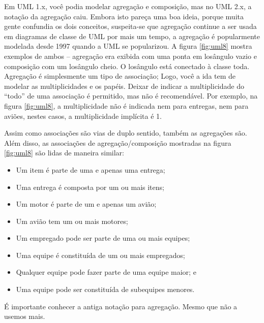 Em UML 1.x, você podia modelar agregação e composição, mas no UML 2.x, a notação da agregação caiu. Embora isto pareça uma boa ideia, porque muita gente confundia os dois conceitos, suspeita-se que agregação continue a ser usada em diagramas de classe de UML por mais um tempo, a agregação é popularmente modelada desde 1997 quando a UML se popularizou. A figura \ref{fig:uml8} mostra exemplos de ambos -- agregação era exibida com uma ponta em losângulo vazio e composição com um losângulo cheio. O losângulo está conectado à classe toda. Agregação é simplesmente um tipo de associação; Logo, você a ida tem de modelar as multiplicidades e os papéis. Deixar de indicar a multiplicidade do ``todo'' de uma associação é permitido, mas não é recomendável. Por exemplo, na figura \ref{fig:uml8}, a multiplicidade não é indicada nem para entregas, nem para aviões, nestes casos, a multiplicidade implícita é 1.

Assim como associações são vias de duplo sentido, também as agregações são. Além disso, as associações de agregação/composição mostradas na figura \ref{fig:uml8} são lidas de maneira similar:
\begin{itemize}
\item Um item é parte de uma e apenas uma entrega;
\item Uma entrega é composta por um ou mais itens;
\item Um motor é parte de um e apenas um avião;
\item Um avião tem um ou mais motores;
\item Um empregado pode ser parte de uma ou mais equipes;
\item Uma equipe é constituída de um ou mais empregados;
\item Qualquer equipe pode fazer parte de uma equipe maior; e
\item Uma equipe pode ser constituída de subequipes menores.
\end{itemize}

É importante conhecer a antiga notação para agregação. Mesmo que não a usemos mais.

